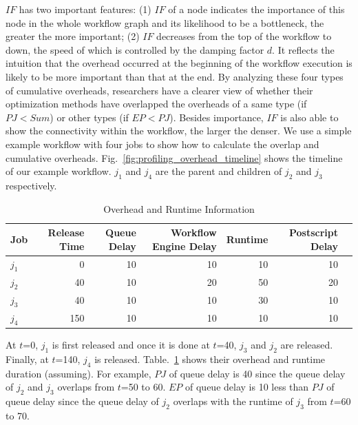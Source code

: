 $IF$ has two important features: (1) $IF$ of a node indicates the importance of this node in the whole workflow graph and its likelihood to be a bottleneck, the greater the more important; (2) $IF$ decreases from the top of the workflow to down, the speed of which is controlled by the damping factor $d$. It reflects the intuition that the overhead occurred at the beginning of the workflow execution is likely to be more important than that at the end.
By analyzing these four types of cumulative overheads, researchers have a clearer view of whether their optimization methods have overlapped the overheads of a same type (if $PJ < Sum$) or other types (if $EP < PJ$). Besides importance, $IF$ is also able to show the connectivity within the workflow, the larger the denser. 
We use a simple example workflow with four jobs to show how to calculate the overlap and cumulative overheads. Fig.~\ref{fig:profiling_overhead_timeline} shows the timeline of our example workflow. $j_1$ and $j_4$ are the parent and children of $j_2$ and $j_3$ respectively.
\begin{table}[htb!]
\caption{Overhead and Runtime Information}
\label{tab:profiling_stats}
\centering
\begin{tabular}{lrrrrrr}
\hline
Job & Release Time &Queue Delay & Workflow Engine Delay & Runtime &Postscript Delay\\

\hline

$j_1$ & 0 & 10 & 10 & 10 & 10\\ 
$j_2$ & 40 & 10 &20 &50&20\\
$j_3$ &40&10&10&30&10\\
$j_4$ &150&10&10&10&10\\

\hline
\end{tabular}
\end{table} 


At $t$=0,  $j_1$ is first released and once it is done at $t$=40, $j_3$ and $j_2$ are released. Finally, at $t$=140, $j_4$ is released. Table.~\ref{tab:profiling_stats} shows their overhead and runtime duration (assuming). 
For example, $PJ$ of queue delay is 40 since the queue delay of $j_2$ and $j_3$ overlaps from $t$=50 to 60. $EP$ of queue delay is 10 less than $PJ$ of queue delay since the queue delay of $j_2$ overlaps with the runtime of $j_3$ from $t$=60 to 70. 
 

